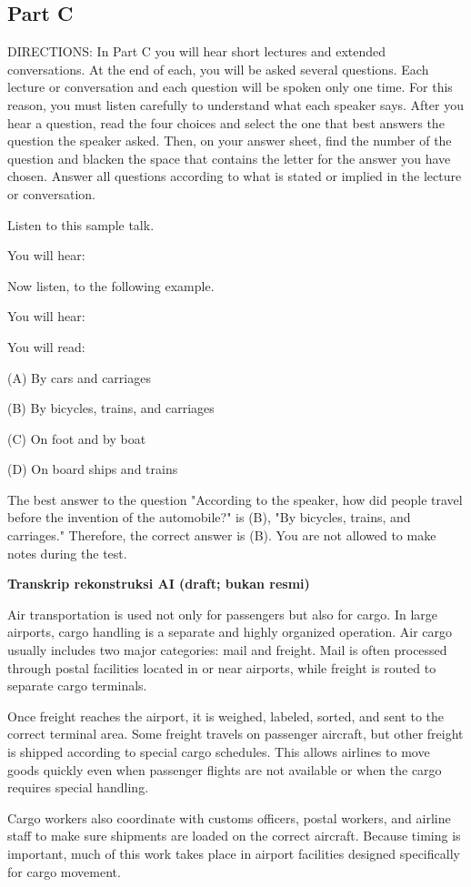 \documentclass[12pt]{article}
\begin{document}
\subsection*{Part C}
DIRECTIONS: In Part C you will hear short lectures and extended conversations. At the end of each, you will be asked several questions. Each lecture or conversation and each question will be spoken only one time. For this reason, you must listen carefully to understand what each speaker says. After you hear a question, read the four choices and select the one that best answers the question the speaker asked. Then, on your answer sheet, find the number of the question and blacken the space that contains the letter for the answer you have chosen. Answer all questions according to what is stated or implied in the lecture or conversation.\par
\begin{exampleblock}
Listen to this sample talk.\par
You will hear:\par
Now listen, to the following example.\par
You will hear:\par
You will read:\par
(A) By cars and carriages\par
(B) By bicycles, trains, and carriages\par
(C) On foot and by boat\par
(D) On board ships and trains\par
The best answer to the question "According to the speaker, how did people travel before the invention of the automobile?" is (B), "By bicycles, trains, and carriages." Therefore, the correct answer is (B). You are not allowed to make notes during the test.\par
\end{exampleblock}
\begin{exampleblock}
\textbf{Transkrip rekonstruksi AI (draft; bukan resmi)}\par
Air transportation is used not only for passengers but also for cargo. In large airports, cargo handling is a separate and highly organized operation. Air cargo usually includes two major categories: mail and freight. Mail is often processed through postal facilities located in or near airports, while freight is routed to separate cargo terminals.\par
Once freight reaches the airport, it is weighed, labeled, sorted, and sent to the correct terminal area. Some freight travels on passenger aircraft, but other freight is shipped according to special cargo schedules. This allows airlines to move goods quickly even when passenger flights are not available or when the cargo requires special handling.\par
Cargo workers also coordinate with customs officers, postal workers, and airline staff to make sure shipments are loaded on the correct aircraft. Because timing is important, much of this work takes place in airport facilities designed specifically for cargo movement.\par
\end{exampleblock}
\end{document}
